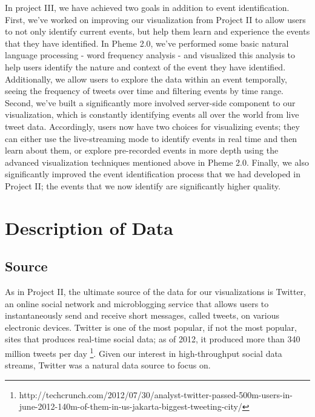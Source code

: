 \documentclass[pdftex,12pt,a4paper]{article}
\begin{document}
In project III, we have achieved two goals in addition to event identification. First, we've worked on improving our visualization from Project II to allow users to not only identify current events, but help them learn and experience the events that they have identified. In Pheme 2.0, we've performed some basic natural language processing - word frequency analysis - and visualized this analysis to help users identify the nature and context of the event they have identified. Additionally, we allow users to explore the data within an event temporally, seeing the frequency of tweets over time and filtering events by time range. Second, we've built a significantly more involved server-side component to our visualization, which is constantly identifying events all over the world from live tweet data. Accordingly, users now have two choices for visualizing events; they can either use the live-streaming mode to identify events in real time and then learn about them, or explore pre-recorded events in more depth using the advanced visualization techniques mentioned above in Pheme 2.0. Finally, we also significantly improved the event identification process that we had developed in Project II; the events that we now identify are significantly higher quality. 

\section{Description of Data}
\subsection{Source}
As in Project II, the ultimate source of the data for our visualizations is Twitter, an online social network and microblogging service that allows users to instantaneously send and receive short messages, called tweets, on various electronic devices. Twitter is one of the most popular, if not the most popular, sites that produces real-time social data; as of 2012, it produced more than 340 million tweets per day \footnote{http://techcrunch.com/2012/07/30/analyst-twitter-passed-500m-users-in-june-2012-140m-of-them-in-us-jakarta-biggest-tweeting-city/}. Given our interest in high-throughput social data streams, Twitter was a natural data source to focus on.
\end{document}
